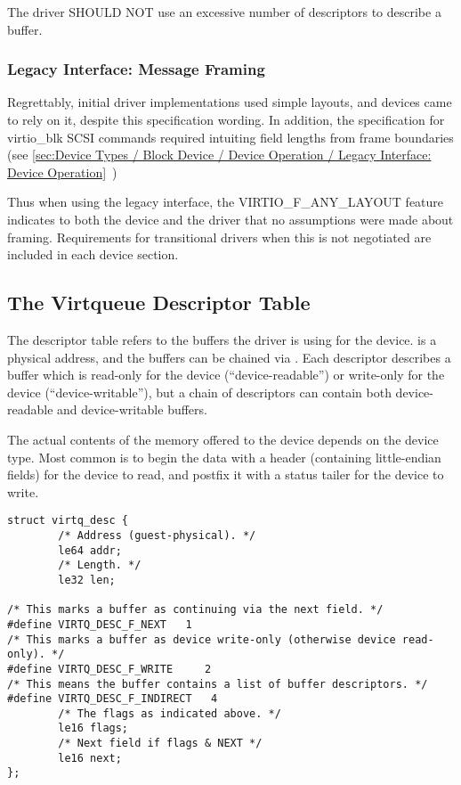 The driver SHOULD NOT use an excessive number of descriptors to
describe a buffer.

\subsubsection{Legacy Interface: Message Framing}\label{sec:Basic Facilities of a Virtio Device / Virtqueues / Message Framing / Legacy Interface: Message Framing}

Regrettably, initial driver implementations used simple layouts, and
devices came to rely on it, despite this specification wording.  In
addition, the specification for virtio_blk SCSI commands required
intuiting field lengths from frame boundaries (see
 \ref{sec:Device Types / Block Device / Device Operation / Legacy Interface: Device Operation}~)

Thus when using the legacy interface, the VIRTIO_F_ANY_LAYOUT
feature indicates to both the device and the driver that no
assumptions were made about framing.  Requirements for
transitional drivers when this is not negotiated are included in
each device section.

\subsection{The Virtqueue Descriptor Table}\label{sec:Basic Facilities of a Virtio Device / Virtqueues / The Virtqueue Descriptor Table}

The descriptor table refers to the buffers the driver is using for
the device.  is a physical address, and the buffers
can be chained via . Each descriptor describes a
buffer which is read-only for the device (``device-readable'') or write-only for the device (``device-writable''), but a chain of
descriptors can contain both device-readable and device-writable buffers.

The actual contents of the memory offered to the device depends on the
device type.  Most common is to begin the data with a header
(containing little-endian fields) for the device to read, and postfix
it with a status tailer for the device to write.

\begin{lstlisting}
struct virtq_desc {
        /* Address (guest-physical). */
        le64 addr;
        /* Length. */
        le32 len;

/* This marks a buffer as continuing via the next field. */
#define VIRTQ_DESC_F_NEXT   1
/* This marks a buffer as device write-only (otherwise device read-only). */
#define VIRTQ_DESC_F_WRITE     2
/* This means the buffer contains a list of buffer descriptors. */
#define VIRTQ_DESC_F_INDIRECT   4
        /* The flags as indicated above. */
        le16 flags;
        /* Next field if flags & NEXT */
        le16 next;
};
\end{lstlisting}

